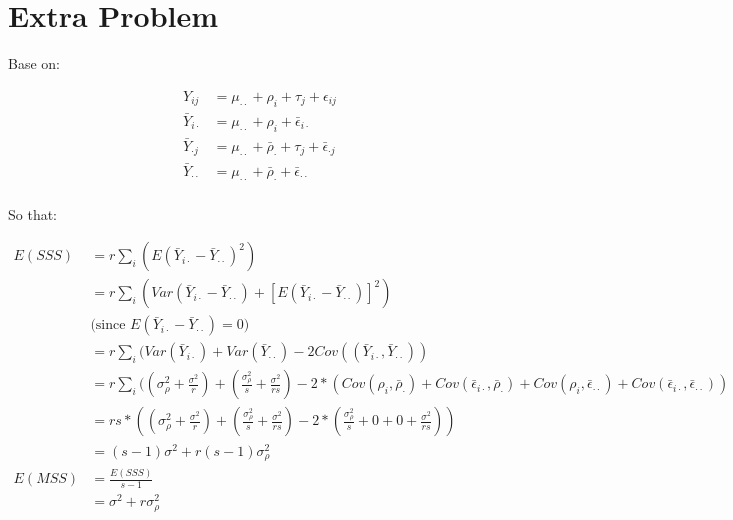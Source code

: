 \documentclass{article}\usepackage[]{graphicx}\usepackage[]{color}
\begin{document}
\section{Extra Problem}

Base on:

\begin{displaymath}
\begin{split}
Y_{ij} &= \mu_{\cdot\cdot} + \rho_i + \tau_j + \epsilon_{ij}\\
\bar{Y}_{i\cdot} &= \mu_{\cdot\cdot} + \rho_i + \bar{\epsilon}_{i\cdot}\\
\bar{Y}_{\cdot j} &= \mu_{\cdot\cdot} + \bar{\rho}_\cdot + \tau_j + \bar{\epsilon}_{\cdot j}\\
\bar{Y}_{\cdot \cdot} &= \mu_{\cdot\cdot} + \bar{\rho}_\cdot + \bar{\epsilon}_{\cdot \cdot}\\
\end{split}
\end{displaymath}

So that:

\begin{displaymath}
\begin{split}
E(SSS) &= r \sum_i (E(\bar{Y}_{i\cdot}-\bar{Y}_{\cdot\cdot})^2) \\
       &= r \sum_i (Var(\bar{Y}_{i\cdot}-\bar{Y}_{\cdot\cdot})+ [E(\bar{Y}_{i\cdot}-\bar{Y}_{\cdot\cdot})]^2)\\
       &\text{(since } E(\bar{Y}_{i\cdot}-\bar{Y}_{\cdot\cdot})=0 \text{)}\\  
       &= r \sum_i (Var(\bar{Y}_{i\cdot}) + Var(\bar{Y}_{\cdot\cdot}) - 2 Cov((\bar{Y}_{i\cdot}, \bar{Y}_{\cdot\cdot}))\\
       &= r \sum_i ( (\sigma_\rho^2+ \frac{\sigma^2}{r}) + (\frac{\sigma_\rho^2}{s}+ \frac{\sigma^2}{rs}) -2*(Cov(\rho_i,\bar{\rho}_\cdot)+Cov(\bar{\epsilon}_{i\cdot}, \bar{\rho}_\cdot)+Cov(\rho_i, \bar{\epsilon}_{\cdot \cdot})+Cov(\bar{\epsilon}_{i\cdot}, \bar{\epsilon}_{\cdot \cdot}))\\
       &= rs * ( (\sigma_\rho^2+ \frac{\sigma^2}{r}) + (\frac{\sigma_\rho^2}{s}+ \frac{\sigma^2}{rs}) -2*(\frac{\sigma_\rho^2}{s} + 0+ 0 + \frac{\sigma^2}{rs}))\\
       &= (s-1)\sigma^2 + r(s-1)\sigma_\rho^2\\
E(MSS) &= \frac{E(SSS)}{s-1}\\
       &= \sigma^2 + r\sigma_\rho^2
\end{split}
\end{displaymath}
\end{document}
